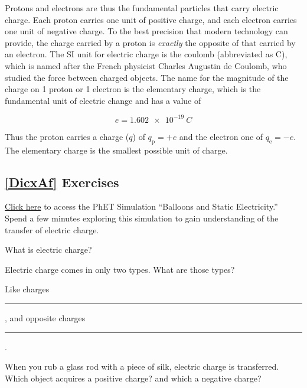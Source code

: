 \documentclass[main.tex]{subfiles}
\begin{document}
\vspace{1em}

Protons and electrons are thus the fundamental particles that carry electric charge. Each proton carries one unit of positive charge, and each electron carries one unit of negative charge. To the best precision that modern technology can provide, the charge carried by a proton is \textit{exactly} the opposite of that carried by an electron. The SI unit for electric charge is the \gls{coulomb} (abbreviated as C), which is named after the French physicist Charles Augustin de Coulomb, who studied the force between charged objects. The name for the magnitude of the charge on 1 proton or 1 electron is the \gls{elementary charge}, which is the fundamental unit of electric change and has a value of 

\begin{equation}
    e = \qty{1.602e-19}{C}
\end{equation}

Thus the proton carries a charge ($q$) of $q_\text{p} = +e$ and the electron one of $q_\text{e} = -e$. The elementary charge is the smallest possible unit of charge.

\subsection*{\ref{DicxAf} Exercises}

\begin{exercise}
    \href{https://phet.colorado.edu/en/simulations/balloons-and-static-electricity/about}{Click here} to access the PhET Simulation ``Balloons and Static Electricity.'' Spend a few minutes exploring this simulation to gain understanding of the transfer of electric charge.
\end{exercise}

\begin{exercise}
    What is electric charge?
\end{exercise}

\begin{exercise}
    Electric charge comes in only two types. What are those types?
\end{exercise}

\begin{exercise}
    Like charges \rule{2cm}{0.15mm}, and opposite charges \rule{2cm}{0.15mm}.
\end{exercise}

\begin{exercise}
    When you rub a glass rod with a piece of silk, electric charge is transferred. Which object acquires a positive charge? and which a negative charge?
\end{exercise}
\end{document}
